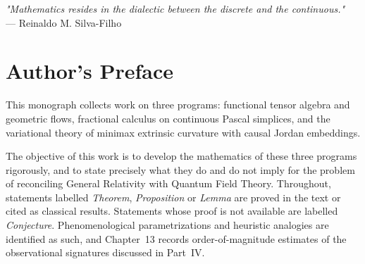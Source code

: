 \documentclass[11pt,a4paper,openright,twoside]{book}
\begin{document}
\vspace{1.5cm}

\begin{flushright}
\textit{"Mathematics resides in the dialectic between the discrete and the continuous."} \\
\vspace{0.2cm}
--- Reinaldo M. Silva-Filho
\end{flushright}
\vfill
\clearpage

\chapter*{Author's Preface}
This monograph collects work on three programs: functional tensor algebra and geometric flows, fractional calculus on continuous Pascal simplices, and the variational theory of minimax extrinsic curvature with causal Jordan embeddings.

The objective of this work is to develop the mathematics of these three programs rigorously, and to state precisely what they do and do not imply for the problem of reconciling General Relativity with Quantum Field Theory. Throughout, statements labelled \emph{Theorem}, \emph{Proposition} or \emph{Lemma} are proved in the text or cited as classical results. Statements whose proof is not available are labelled \emph{Conjecture}. Phenomenological parametrizations and heuristic analogies are identified as such, and Chapter~13 records order-of-magnitude estimates of the observational signatures discussed in Part~IV.
\end{document}
